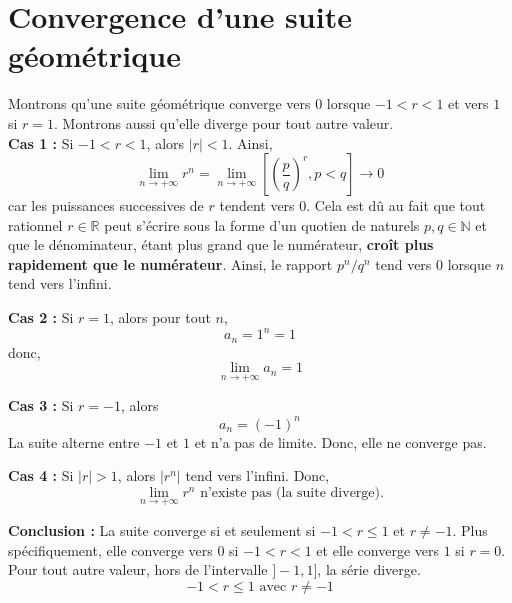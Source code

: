 \documentclass{report}
\begin{document}
    \section{Convergence d'une suite géométrique}

    \begin{Preuve}{}{}
        Montrons qu'une suite géométrique converge vers $0$ lorsque 
        $-1 < r < 1$ et vers $1$ si $r = 1$. Montrons aussi qu'elle diverge pour tout autre valeur. 
        \vspace{1em}\\ 
        \textbf{Cas 1 :} Si $-1 < r < 1$, alors $|r| < 1$. Ainsi,
        \[
            \lim\limits_{n\to+\infty} r^n = \lim\limits_{n \to+\infty } 
            \left[ \left(\dfrac{p}{q}\right)^r, p < q \right] \longrightarrow 0
        \]
        car les puissances successives de $r$ tendent vers 0. 
        Cela est dû au fait que tout rationnel $r \in \mathbb{R}$
        peut s'écrire sous la forme d'un quotien de naturels 
        $p, q \in \mathbb{N}$ et que le dénominateur, 
        étant plus grand que le numérateur, 
        \textbf{croît plus rapidement que le numérateur}. Ainsi, le rapport 
        $p^n/q^n$ tend vers 0 lorsque $n$ tend vers l'infini. 

        \textbf{Cas 2 :} Si $r = 1$, alors pour tout $n$,
        \[
        a_n = 1^n = 1
        \]
        donc,
        \[
        \lim\limits_{n\to+\infty} a_n = 1
        \]

        \textbf{Cas 3 :} Si $r = -1$, alors
        \[
        a_n = (-1)^n
        \]
        La suite alterne entre $-1$ et $1$ et n'a pas de limite. Donc, elle ne converge pas.

        \textbf{Cas 4 :} Si $|r| > 1$, alors $|r^n|$ tend vers l'infini. Donc,
        \[
        \lim\limits_{n\to+\infty} r^n \text{ n'existe pas (la suite diverge).}
        \]

        \textbf{Conclusion :} La suite converge si et seulement si $-1 < r \leq 1$ et $r \neq -1$. Plus spécifiquement, 
        elle converge vers $0$ si $ -1 < r < 1$ et elle converge vers $1$ si $r = 0$. Pour tout autre valeur, 
        hors de l'intervalle $]-1, 1]$, la série diverge. 
        \[
        \boxed{
            -1 < r \leq 1 \text{ avec } r \neq -1
    } \]           
    \end{Preuve}
    
\end{document}

